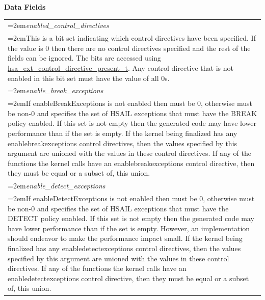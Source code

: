 \documentclass[final,oneside]{book}
\newcommand{\reffld}[1]{\textit{#1}}
\begin{document}
\noindent\textbf{Data Fields}\\[-6mm]
\begin{longtable}{@{}>{\hangindent=2em}p{\textwidth}}
\hypertarget{hsa_\-ext_\-control_\-directives_\-t.enabled_\-control_\-directives}{\reffld{enabled_\-control_\-directives}}\\\hspace{2em}This is a bit set indicating which control directives have been specified. If the value is 0 then there are no control directives specified and the rest of the fields can be ignored. The bits are accessed using \hyperlink{group__ext-finalizer_1ga143d9e622dfd7889d52fb5eb5ed1ffdb}{hsa_\-ext_\-control_\-directive_\-present_\-t}. Any control directive that is not enabled in this bit set must have the value of all 0s.\\[2mm]
\hypertarget{hsa_\-ext_\-control_\-directives_\-t.enable_\-break_\-exceptions}{\reffld{enable_\-break_\-exceptions}}\\\hspace{2em}If enableBreakExceptions is not enabled then must be 0, otherwise must be non-0 and specifies the set of HSAIL exceptions that must have the BREAK policy enabled. If this set is not empty then the generated code may have lower performance than if the set is empty. If the kernel being finalized has any enablebreakexceptions control directives, then the values specified by this argument are unioned with the values in these control directives. If any of the functions the kernel calls have an enablebreakexceptions control directive, then they must be equal or a subset of, this union.\\[2mm]
\hypertarget{hsa_\-ext_\-control_\-directives_\-t.enable_\-detect_\-exceptions}{\reffld{enable_\-detect_\-exceptions}}\\\hspace{2em}If enableDetectExceptions is not enabled then must be 0, otherwise must be non-0 and specifies the set of HSAIL exceptions that must have the DETECT policy enabled. If this set is not empty then the generated code may have lower performance than if the set is empty. However, an implementation should endeavor to make the performance impact small. If the kernel being finalized has any enabledetectexceptions control directives, then the values specified by this argument are unioned with the values in these control directives. If any of the functions the kernel calls have an enabledetectexceptions control directive, then they must be equal or a subset of, this union.\\[2mm]

\end{longtable}
\end{document}
